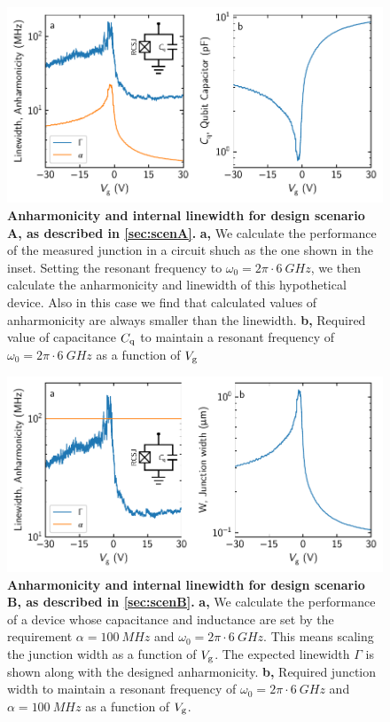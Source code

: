\begin{figure}[]
	\centering
	\includegraphics[width=.9\linewidth]{chapter-gJJ/figs/supp_anharmonicity_2.pdf}
	\caption{{\bf Anharmonicity and internal linewidth for design scenario A, as described in \ref{sec:scenA}.}
		\textbf{a,} We calculate the performance of the measured junction in a circuit shuch as the one shown in the inset.
		Setting the resonant frequency to $\omega_0 = 2\pi\cdot\SI{6}{GHz}$, we then calculate the anharmonicity and linewidth of this hypothetical device.
		Also in this case we find that calculated values of anharmonicity are always smaller than the linewidth.
		\textbf{b,} Required value of capacitance $C_{\rm q}$ to maintain a resonant frequency of $\omega_0 = 2\pi\cdot\SI{6}{GHz}$ as a function of $V_{\rm g}$}
	\label{fig:anharm2}
\end{figure}

\begin{figure}[]
	\centering
	\includegraphics[width=.9\linewidth]{chapter-gJJ/figs/supp_anharmonicity_3.pdf}
	\caption{{\bf Anharmonicity and internal linewidth for design scenario B, as described in \ref{sec:scenB}.}
		\textbf{a,} We calculate the performance of a device whose capacitance and inductance are set by the requirement $\alpha = \SI{100}{MHz}$ and $\omega_0 = 2\pi\cdot\SI{6}{GHz}$.  This means scaling the junction width as a function of $V_{\rm g}$.  The expected linewidth $\Gamma$ is shown along with the designed anharmonicity.
		\textbf{b,} Required junction width to maintain a resonant frequency of $\omega_0 = 2\pi\cdot\SI{6}{GHz}$ and $\alpha = \SI{100}{MHz}$ as a function of $V_{\rm g}$.}
	\label{fig:anharm3}
\end{figure}

